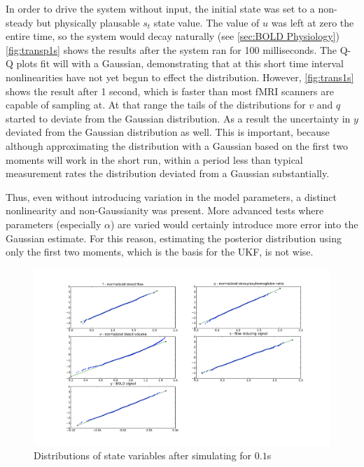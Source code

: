 In order to drive the system without input, the initial state was set
to a non-steady but physically 
plausable $s_t$ state value. The value of $u$ was left at zero 
the entire time, so the 
system would decay naturally (see \autoref{sec:BOLD Physiology})
\autoref{fig:transp1s} shows the results after the
system ran for 100 milliseconds. 
The Q-Q plots fit will with a Gaussian, demonstrating that at this short
time interval nonlinearities have not yet begun to effect the distribution.
However, \autoref{fig:trans1s} shows the result after 1 second, which is faster
than most \ac{fMRI} scanners are capable of sampling at. At that range the tails 
of the distributions for $v$ and $q$ started to deviate from the
Gaussian distribution. As a result the uncertainty in $y$ deviated from
the Gaussian distribution as well. This is important, because although 
approximating the distribution with a Gaussian based on the first two
moments will work in the short run, within a period less than typical
measurement rates the distribution deviated from a Gaussian substantially. 

Thus, even without introducing variation in the model parameters,
a distinct nonlinearity and non-Gaussianity was present. 
More advanced tests where parameters (especially $\alpha$) are varied
would certainly introduce more error into the Gaussian estimate. 
For this reason, estimating the posterior distribution using only 
the first two moments, which is the basis for the \ac{UKF}, is not wise. 

\begin{figure}
\centering
\includegraphics[trim=6cm .75cm 6cm .75cm,width=16cm]{images/gauss_step_point1sec_3sigma.pdf}
\caption{Distributions of state variables after simulating for $0.1$s}
\label{fig:transp1s}
\end{figure}

